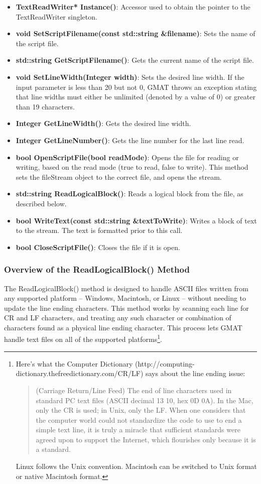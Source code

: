 \begin{itemize}
\item \textbf{TextReadWriter* Instance()}: Accessor used to obtain the pointer to the
TextReadWriter singleton.
\item \textbf{void SetScriptFilename(const std::string \&filename)}: Sets the name of the script
file.
\item \textbf{std::string GetScriptFilename()}: Gets the current name of the script file.
\item \textbf{void SetLineWidth(Integer width)}: Sets the desired line width.  If the input
parameter is less than 20 but not 0, GMAT throws an exception stating that line widths must either
be unlimited (denoted by a value of 0) or greater than 19 characters.
\item \textbf{Integer GetLineWidth()}: Gets the desired line width.
\item \textbf{Integer GetLineNumber()}: Gets the line number for the last line read.
\item \textbf{bool OpenScriptFile(bool readMode)}:  Opens the file for reading or writing, based on
the read mode (true to read, false to write).  This method sets the fileStream object to the
correct file, and opens the stream.
\item \textbf{std::string ReadLogicalBlock()}: Reads a logical block from the file, as described
below.
\item \textbf{bool WriteText(const std::string \&textToWrite)}: Writes a block of text to the
stream.  The text is formatted prior to this call.
\item \textbf{bool CloseScriptFile()}:  Closes the file if it is open.
\end{itemize}

\subsubsection{Overview of the ReadLogicalBlock() Method}

The ReadLogicalBlock() method is designed to handle ASCII files written from any supported platform
-- Windows, Macintosh, or Linux -- without needing to update the line ending characters.  This
method works by scanning each line for CR and LF characters, and treating any such character or
combination of characters found as a physical line ending character.  This process lets GMAT handle
text files on all of the supported platforms\footnote{Here's what the Computer Dictionary
(http://computing-dictionary.thefreedictionary.com/CR/LF) says about the line ending issue:
\begin{quote}
(Carriage Return/Line Feed) The end of line characters used in standard PC text files (ASCII
decimal 13 10, hex 0D 0A). In the Mac, only the CR is used; in Unix, only the LF. When one considers
that the computer world could not standardize the code to use to end a simple text line, it is truly
a miracle that sufficient standards were agreed upon to support the Internet, which flourishes only
because it is a standard.
\end{quote}
\noindent Linux follows the Unix convention.  Macintosh can be switched to Unix format or native
Macintosh format.}.

